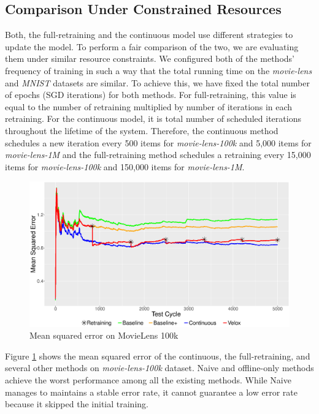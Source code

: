 \documentclass{vldb}
\begin{document}
\subsection{Comparison Under Constrained Resources }
Both, the full-retraining and the continuous model use different strategies to update the model.
To perform a fair comparison of the two, we are evaluating them under similar resource constraints.
We configured both of the methods' frequency of training in such a way that the total running time on the \textit{movie-lens} and \textit{MNIST} datasets are similar.
To achieve this, we have fixed the total number of epochs (SGD iterations) for both methods.
For full-retraining, this value is equal to the number of retraining multiplied by number of iterations in each retraining. 
For the continuous model, it is total number of scheduled iterations throughout the lifetime of the system.
Therefore, the continuous method schedules a new iteration every 500 items for \textit{movie-lens-100k} and 5,000 items for \textit{movie-lens-1M} and the full-retraining method schedules a retraining every 15,000 items for \textit{movie-lens-100k} and 150,000 items for \textit{movie-lens-1M}.
\begin{figure}[h]
\centering
\includegraphics[width=\columnwidth]{../images/experiment-results/movie-lens-100k-quality-improved.eps}
\caption{Mean squared error on MovieLens 100k}
\label{fig:movie-lens-100k-score}
\end{figure}
Figure \ref{fig:movie-lens-100k-score} shows the mean squared error of the continuous, the full-retraining, and several other methods on \textit{movie-lens-100k} dataset.
Naive and offline-only methods achieve the worst performance among all the existing methods.
While Naive manages to maintains a stable error rate, it cannot guarantee a low error rate because it skipped the initial training.
\end{document}
